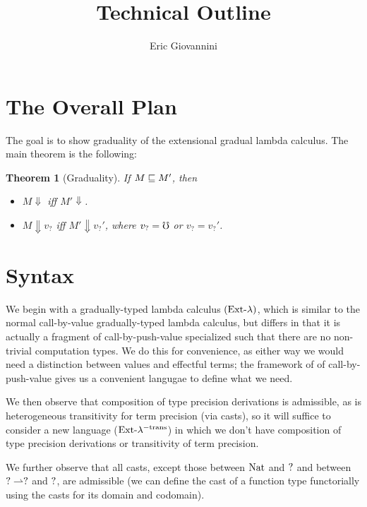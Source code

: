 \documentclass{article}
\newtheorem{theorem}{Theorem}[section]
\begin{document}
\title{Technical Outline}
\author{Eric Giovannini}

\maketitle

\section{The Overall Plan}

The goal is to show graduality of the extensional gradual lambda calculus.
The main theorem is the following:

\begin{theorem}[Graduality]
If $M \sqsubseteq M'$, then

\begin{itemize}
    \item $M \Downarrow$ iff $M' \Downarrow$.
    \item $M \Downarrow v_?$ iff $M' \Downarrow v_?'$, where $v_? = \mho$ or $v_? = v_?'$.
\end{itemize}
\end{theorem}


\section{Syntax}


    We begin with a gradually-typed lambda calculus $(\text{Ext-}\lambda)$, which is similar to
    the normal call-by-value gradually-typed lambda calculus, but differs in that it
    is actually a fragment of call-by-push-value specialized such that there are no
    non-trivial computation types. We do this for convenience, as either way
    we would need a distinction between values and effectful terms; the framework of
    of call-by-push-value gives us a convenient langugae to define what we need.

    We then observe that composition of type precision derivations is admissible, 
    as is heterogeneous transitivity for term
    precision (via casts), so it will suffice to consider a new language ($\text{Ext-}\lambda^{-\text{trans}}$)
    in which we don't have composition of type precision derivations or transitivity
    of term precision.

    We further observe that all casts, except those between $\text{Nat}$ and $?$
    and between $? \rightharpoonup ?$ and $?$, are admissible
    (we can define the cast of a function type
    functorially using the casts for its domain and codomain).
\end{document}
